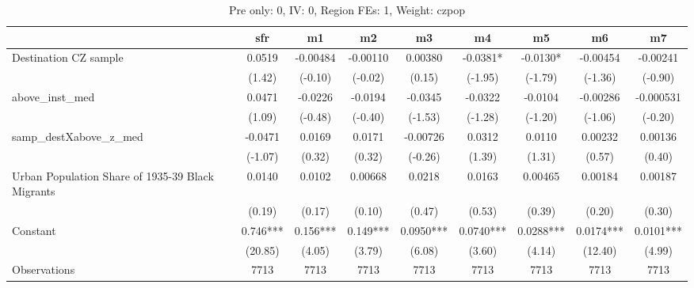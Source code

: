 \begin{table}[htbp]\centering
\def\sym#1{\ifmmode^{#1}\else\(^{#1}\)\fi}
\caption{Pre only: 0, IV: 0, Region FEs: 1, Weight: czpop}
\begin{tabular}{l*{8}{c}}
\toprule
                    &\multicolumn{1}{c}{sfr}&\multicolumn{1}{c}{m1}&\multicolumn{1}{c}{m2}&\multicolumn{1}{c}{m3}&\multicolumn{1}{c}{m4}&\multicolumn{1}{c}{m5}&\multicolumn{1}{c}{m6}&\multicolumn{1}{c}{m7}\\
\midrule
Destination CZ sample&      0.0519   &    -0.00484   &    -0.00110   &     0.00380   &     -0.0381*  &     -0.0130*  &    -0.00454   &    -0.00241   \\
                    &      (1.42)   &     (-0.10)   &     (-0.02)   &      (0.15)   &     (-1.95)   &     (-1.79)   &     (-1.36)   &     (-0.90)   \\
\addlinespace
above\_inst\_med      &      0.0471   &     -0.0226   &     -0.0194   &     -0.0345   &     -0.0322   &     -0.0104   &    -0.00286   &   -0.000531   \\
                    &      (1.09)   &     (-0.48)   &     (-0.40)   &     (-1.53)   &     (-1.28)   &     (-1.20)   &     (-1.06)   &     (-0.20)   \\
\addlinespace
samp\_destXabove\_z\_med&     -0.0471   &      0.0169   &      0.0171   &    -0.00726   &      0.0312   &      0.0110   &     0.00232   &     0.00136   \\
                    &     (-1.07)   &      (0.32)   &      (0.32)   &     (-0.26)   &      (1.39)   &      (1.31)   &      (0.57)   &      (0.40)   \\
\addlinespace
Urban Population Share of 1935-39 Black Migrants&      0.0140   &      0.0102   &     0.00668   &      0.0218   &      0.0163   &     0.00465   &     0.00184   &     0.00187   \\
                    &      (0.19)   &      (0.17)   &      (0.10)   &      (0.47)   &      (0.53)   &      (0.39)   &      (0.20)   &      (0.30)   \\
\addlinespace
Constant            &       0.746***&       0.156***&       0.149***&      0.0950***&      0.0740***&      0.0288***&      0.0174***&      0.0101***\\
                    &     (20.85)   &      (4.05)   &      (3.79)   &      (6.08)   &      (3.60)   &      (4.14)   &     (12.40)   &      (4.99)   \\
\midrule
Observations        &        7713   &        7713   &        7713   &        7713   &        7713   &        7713   &        7713   &        7713   \\

\end{tabular}
\end{table}
